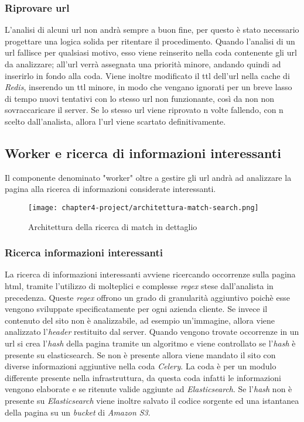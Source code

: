 \subsubsection{Riprovare url}

L'analisi di alcuni url non andrà sempre a buon fine, per questo è stato necessario progettare una logica solida per ritentare il procedimento. Quando l'analisi di un \gls{url} fallisce per qualsiasi motivo, esso viene reinserito nella coda contenente gli url da analizzare; all'url verrà assegnata una priorità minore, andando quindi ad inserirlo in fondo alla coda. Viene inoltre modificato il \gls{ttl} dell'url nella cache di \emph{Redis}, inserendo un \gls{ttl} minore, in modo che vengano ignorati per un breve lasso di tempo nuovi tentativi con lo stesso \gls{url} non funzionante, così da non non sovraccaricare il server. Se lo stesso \gls{url} viene riprovato n volte fallendo, con n scelto dall'analista, allora l'\gls{url} viene scartato definitivamente.


\subsection{Worker e ricerca di informazioni interessanti}

Il componente denominato "worker" oltre a gestire gli url andrà ad analizzare la pagina alla ricerca di informazioni considerate interessanti.
\begin{figure}[!h] 
    \centering 
    \texttt{[image: chapter4-project/architettura-match-search.png]} 
    \caption{Architettura della ricerca di match in dettaglio}
\end{figure}

\subsubsection{Ricerca informazioni interessanti}

La ricerca di informazioni interessanti avviene ricercando occorrenze sulla pagina html, tramite l'utilizzo di molteplici e complesse \emph{regex} stese dall'analista in precedenza. Queste \emph{regex} offrono un grado di granularità aggiuntivo poichè esse vengono sviluppate specificatamente per ogni azienda cliente. Se invece il contenuto del sito non è analizzabile, ad esempio un'immagine, allora viene analizzato l'\emph{header} restituito dal server. Quando vengono trovate occorrenze in un url si crea l'\emph{hash} della pagina tramite un algoritmo e viene controllato se l'\emph{hash} è presente su elasticsearch. Se non è presente allora viene mandato il sito con diverse informazioni aggiuntive nella coda \emph{Celery}. La coda è per un modulo differente presente nella infrastruttura, da questa coda infatti le informazioni vengono elaborate e se ritenute valide aggiunte ad \emph{Elasticsearch}. \newline{}
Se l'\emph{hash} non è presente su \emph{Elasticsearch} viene inoltre salvato il codice sorgente ed una istantanea della pagina su un \emph{bucket} di \emph{Amazon S3}.
